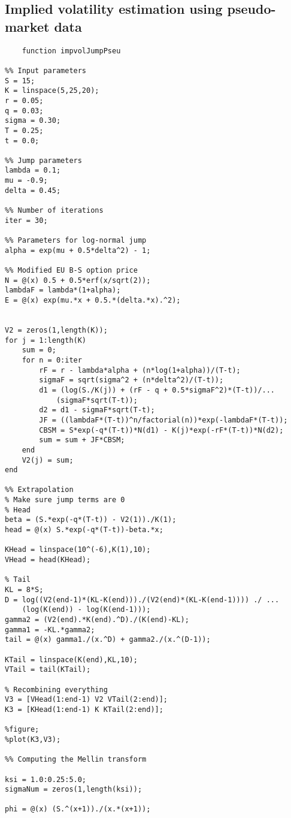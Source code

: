 \subsection{Implied volatility estimation using pseudo-market data}
\begin{lstlisting}
    function impvolJumpPseu

%% Input parameters
S = 15;
K = linspace(5,25,20);
r = 0.05;
q = 0.03;
sigma = 0.30;
T = 0.25;
t = 0.0;

%% Jump parameters
lambda = 0.1;
mu = -0.9;
delta = 0.45;

%% Number of iterations
iter = 30;

%% Parameters for log-normal jump
alpha = exp(mu + 0.5*delta^2) - 1;

%% Modified EU B-S option price
N = @(x) 0.5 + 0.5*erf(x/sqrt(2));
lambdaF = lambda*(1+alpha);
E = @(x) exp(mu.*x + 0.5.*(delta.*x).^2);


V2 = zeros(1,length(K));
for j = 1:length(K)
    sum = 0;
    for n = 0:iter
        rF = r - lambda*alpha + (n*log(1+alpha))/(T-t);
        sigmaF = sqrt(sigma^2 + (n*delta^2)/(T-t));
        d1 = (log(S./K(j)) + (rF - q + 0.5*sigmaF^2)*(T-t))/...
            (sigmaF*sqrt(T-t));
        d2 = d1 - sigmaF*sqrt(T-t);
        JF = ((lambdaF*(T-t))^n/factorial(n))*exp(-lambdaF*(T-t));
        CBSM = S*exp(-q*(T-t))*N(d1) - K(j)*exp(-rF*(T-t))*N(d2);
        sum = sum + JF*CBSM;
    end
    V2(j) = sum;
end

%% Extrapolation
% Make sure jump terms are 0
% Head
beta = (S.*exp(-q*(T-t)) - V2(1))./K(1);
head = @(x) S.*exp(-q*(T-t))-beta.*x;

KHead = linspace(10^(-6),K(1),10);
VHead = head(KHead);

% Tail
KL = 8*S;
D = log((V2(end-1)*(KL-K(end)))./(V2(end)*(KL-K(end-1)))) ./ ...
    (log(K(end)) - log(K(end-1))); 
gamma2 = (V2(end).*K(end).^D)./(K(end)-KL);
gamma1 = -KL.*gamma2;
tail = @(x) gamma1./(x.^D) + gamma2./(x.^(D-1));

KTail = linspace(K(end),KL,10);
VTail = tail(KTail);

% Recombining everything
V3 = [VHead(1:end-1) V2 VTail(2:end)];
K3 = [KHead(1:end-1) K KTail(2:end)];

%figure;
%plot(K3,V3);

%% Computing the Mellin transform

ksi = 1.0:0.25:5.0;
sigmaNum = zeros(1,length(ksi));

phi = @(x) (S.^(x+1))./(x.*(x+1));


\end{lstlisting}
